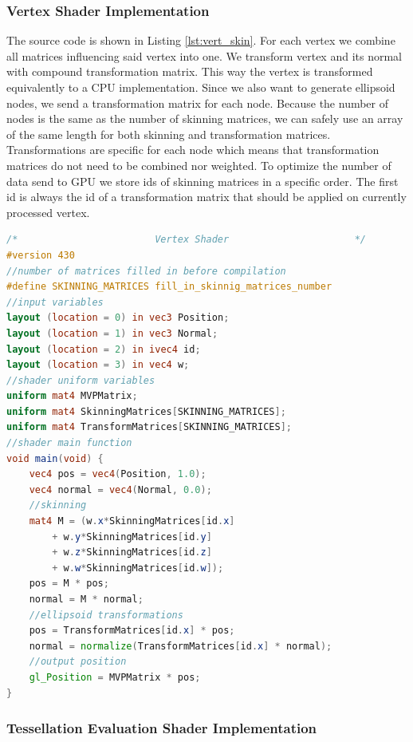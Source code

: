 \subsubsection{Vertex Shader Implementation}

The source code is shown in Listing \ref{lst:vert_skin}.
For each vertex we combine all matrices influencing said vertex into one.
We transform vertex and its normal with compound transformation matrix.
This way the vertex is transformed equivalently to a CPU implementation.
Since we also want to generate ellipsoid nodes, we send a transformation matrix for each node.
Because the number of nodes is the same as the number of skinning matrices, we can safely use an array of the same length for both skinning and transformation matrices.
Transformations are specific for each node which means that transformation matrices do not need to be combined nor weighted.
To optimize the number of data send to GPU we store ids of skinning matrices in a specific order.
The first id is always the id of a transformation matrix that should be applied on currently processed vertex.

\linespread{1.2}
\begin{lstlisting}[language=GLSL,caption={Linear Blend Skinning implemented in vertex shader},label={lst:vert_skin}]
/*                        Vertex Shader                      */ 
#version 430
//number of matrices filled in before compilation
#define SKINNING_MATRICES fill_in_skinnig_matrices_number
//input variables
layout (location = 0) in vec3 Position;
layout (location = 1) in vec3 Normal;
layout (location = 2) in ivec4 id;
layout (location = 3) in vec4 w;
//shader uniform variables
uniform mat4 MVPMatrix;
uniform mat4 SkinningMatrices[SKINNING_MATRICES];
uniform mat4 TransformMatrices[SKINNING_MATRICES];
//shader main function
void main(void) {
	vec4 pos = vec4(Position, 1.0);
	vec4 normal = vec4(Normal, 0.0);
	//skinning
	mat4 M = (w.x*SkinningMatrices[id.x]
		+ w.y*SkinningMatrices[id.y] 
		+ w.z*SkinningMatrices[id.z] 
		+ w.w*SkinningMatrices[id.w]);
	pos = M * pos;
	normal = M * normal;
	//ellipsoid transformations
	pos = TransformMatrices[id.x] * pos;
	normal = normalize(TransformMatrices[id.x] * normal);
	//output position
	gl_Position = MVPMatrix * pos;
}
\end{lstlisting} 
\linespread{1.5}

\subsubsection{Tessellation Evaluation Shader Implementation}

